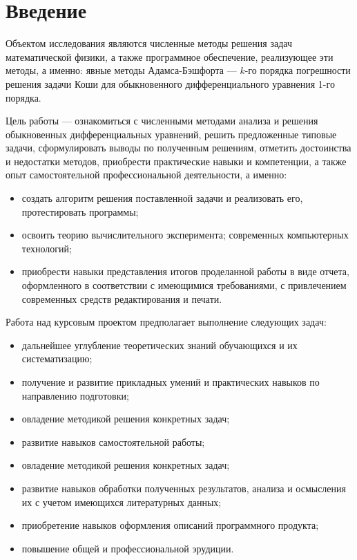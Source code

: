 \documentclass[a4paper,fleqn,14pt,titlepage]{extarticle}
\begin{document}
	\tableofcontents
	\pagebreak
	\section{Введение}
	Объектом исследования являются численные методы решения задач математической физики, а также программное обеспечение, реализующее эти методы, а именно: явные методы Адамса-Бэшфорта ---  ${k}$-го порядка погрешности решения задачи Коши для обыкновенного дифференциального уравнения 1-го порядка.
	
	Цель работы --- ознакомиться с численными методами анализа и решения обыкновенных дифференциальных уравнений, решить предложенные типовые задачи, сформулировать выводы по полученным решениям, отметить достоинства и недостатки методов, приобрести практические навыки и компетенции, а также опыт самостоятельной профессиональной деятельности, а именно:
	\begin{itemize}
		\item создать алгоритм решения поставленной задачи и реализовать его, протестировать программы;
		\item освоить теорию вычислительного эксперимента; современных компьютерных технологий; 
		\item приобрести навыки представления итогов проделанной работы в виде отчета, оформленного в соответствии с имеющимися требованиями, с привлечением современных средств редактирования и печати.
	\end{itemize}
	Работа над курсовым проектом предполагает выполнение следующих задач:
	\begin{itemize}
		\item дальнейшее углубление теоретических знаний обучающихся и их систематизацию;
		\item получение и развитие прикладных умений и практических навыков по направлению подготовки; 
		\item овладение методикой решения конкретных задач;
		\item развитие навыков самостоятельной работы;
		\item овладение методикой решения конкретных задач;
		\item развитие навыков обработки полученных результатов, анализа и осмысления их с учетом имеющихся литературных данных;
		\item приобретение навыков оформления описаний программного продукта;
		\item повышение общей и профессиональной эрудиции.
	\end{itemize}
\end{document}
